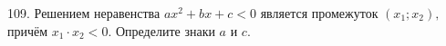 109. Решением неравенства $ax^2 + bx + c < 0$ является промежуток $(x_1; x_2),$ причём $x_1\cdot x_2 <  0.$ Определите знаки $a$ и $c.$\\
